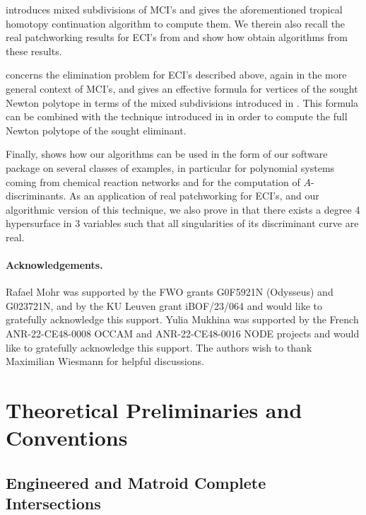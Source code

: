 \documentclass[a4paper]{article}
\theoremstyle{remark}
\begin{document}
 introduces mixed subdivisions of MCI's and gives the
aforementioned tropical homotopy continuation algorithm to compute
them. We therein also recall the real patchworking results for ECI's
from \cite{esterovEngineeredCompleteIntersections2025} and show how
obtain algorithms from these results.

 concerns the elimination problem for ECI's described
above, again in the more general context of MCI's, and gives an
effective formula for vertices of the sought Newton polytope in terms
of the mixed subdivisions introduced in .  This formula
can be combined with the technique introduced in
\cite{hugginsIB4eSoftwareFramework2006} in order to compute the full
Newton polytope of the sought eliminant.

Finally,  shows how our algorithms can be used in
the form of our software package on several classes of examples, in
particular for polynomial systems coming from chemical reaction
networks and for the computation of $A$-discriminants. As an
application of real patchworking for ECI's, and our algorithmic
version of this technique, we also prove in  that
there exists a degree 4 hypersurface in 3 variables such that all
singularities of its discriminant curve are real.

{\footnotesize \paragraph*{Acknowledgements.}
\label{par:ack}

Rafael Mohr was supported by the FWO grants G0F5921N (Odysseus) and
G023721N, and by the KU Leuven grant iBOF/23/064 and would like to
gratefully acknowledge this support. Yulia Mukhina was supported by
the French ANR-22-CE48-0008 OCCAM and ANR-22-CE48-0016 NODE projects
and would like to gratefully acknowledge this support. The authors
wish to thank Maximilian Wiesmann for helpful discussions.}

\section{Theoretical Preliminaries and Conventions}
\label{sec:prelim}

\subsection{Engineered and Matroid Complete Intersections}
\label{sec:ecis}
\end{document}
